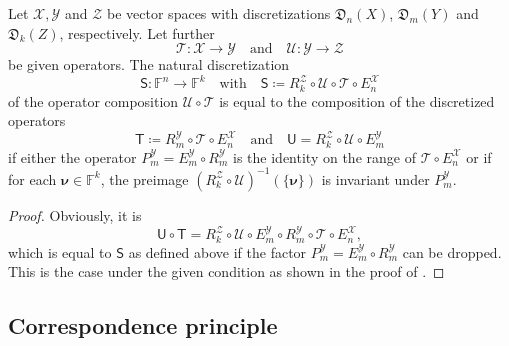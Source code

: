 \documentclass[a4paper]{paper}
\newcommand*{\SPC}[1]{{\ensuremath{\mathscr{#1}}}}
\newcommand*{\SPCX}{\SPC{X}}
\newcommand*{\SPCY}{\SPC{Y}}
\newcommand*{\SPCZ}{\SPC{Z}}
\newcommand{\FIELD}{{\ensuremath{\mathbb{F}}}}
\newcommand*{\Fn}{{\ensuremath{\FIELD^n}}}
\newcommand*{\Fk}{{\ensuremath{\FIELD^k}}}
\newcommand*{\OP}[1]{{\ensuremath{\mathcal{#1}}}}
\newcommand*{\OPT}{\OP{T}}
\newcommand*{\OPU}{\OP{U}}
\newcommand{\DISCOP}[1]{{\ensuremath{\mathsf{#1}}}}
\newcommand*{\DISCOPT}{\DISCOP{T}}
\newcommand*{\DISCOPU}{\DISCOP{U}}
\newcommand*{\EXT}[2]{\ensuremath{E_{#1}^{#2}}}
\newcommand*{\REST}[2]{\ensuremath{R_{#1}^{#2}}}
\newcommand*{\PROJ}[2]{\ensuremath{P_{#1}^{#2}}}
\newcommand*{\RmY}{{\ensuremath{\REST{m}{\SPC{Y}}}}}
\newcommand*{\EnX}{{\ensuremath{\EXT{n}{\SPC{X}}}}}
\newcommand*{\EmY}{{\ensuremath{\EXT{m}{\SPC{Y}}}}}
\newcommand*{\PmY}{{\ensuremath{\PROJ{m}{\SPCY}}}}
\newcommand*{\DISCR}[2]{{\ensuremath{\mathfrak{D}_{#2}(#1)}}}
\newcommand*{\DISCRnX}{\DISCR{X}{n}}
\newcommand*{\DISCRmY}{\DISCR{Y}{m}}
\newcommand*{\DISCRkZ}{\DISCR{Z}{k}}
\newcommand{\vnu}{\boldsymbol{\nu}}
\begin{document}
\begin{lemma}
 \label{lemma:discr:operator:op_comp:natural_is_comp}
 Let $\SPCX, \SPCY$ and $\SPCZ$ be vector spaces with discretizations $\DISCRnX$, 
 $\DISCRmY$ and $\DISCRkZ$, respectively. Let further
 \begin{equation*}
  \OPT \colon \SPCX \to \SPCY \quad \text{and} \quad \OPU \colon \SPCY \to \SPCZ
 \end{equation*}
 be given operators. The natural discretization
 \begin{equation*}
  \DISCOP{S}\colon \Fn \to \Fk 
  \quad \text{with} \quad
  \DISCOP{S} \coloneqq  \REST{k}{\SPCZ} \circ \OPU \circ \OPT \circ \EnX
 \end{equation*}
 of the operator composition $\OPU \circ \OPT$ is equal to the composition of the discretized operators
 \begin{equation*}
  \DISCOPT \coloneqq  \RmY \circ \OPT \circ \EnX
  \quad \text{and} \quad
  \DISCOPU = \REST{k}{\SPCZ} \circ \OPU \circ \EmY
 \end{equation*}
 if either the operator $\PmY = \EmY \circ \RmY$ is the identity on the range of $\OPT \circ \EnX$ or if for each 
 $\vnu \in \Fk$, the preimage $(\REST{k}{\SPCZ} \circ \OPU)^{-1}(\{\vnu\})$ is invariant under 
 $\PmY$.
\end{lemma}
\vspace{1em}


\begin{proof}
 Obviously, it is
 \begin{equation*}
  \DISCOPU \circ \DISCOPT = \REST{k}{\SPCZ} \circ \OPU \circ \EmY \circ \RmY \circ \OPT \circ \EnX,
 \end{equation*}
 which is equal to $\DISCOP{S}$ as defined above if the factor $\PmY = \EmY \circ \RmY$ can be dropped. This is the 
 case under the given condition as shown in the proof of .
\end{proof}



\subsection{Correspondence principle}
\label{subsec:discr:corresp}
\end{document}
